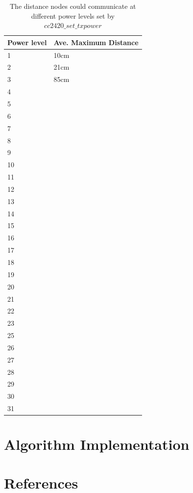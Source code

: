 \documentclass[a4paper,notitlepage]{article}
\begin{document}
\begin{table}[H]
	\centering
	\begin{tabular}{ | l | l | }
		\hline
		Power level & Ave. Maximum Distance \\
		\hline
		1 & 10cm \\
		2 & 21cm \\
		3 & 85cm \\
		4 & ~ \\
		5 & ~ \\
		6 & ~ \\
		7 & ~ \\
		8 & ~ \\
		9 & ~ \\
		10 & ~ \\
		11 & ~ \\
		12 & ~ \\
		13 & ~ \\
		14 & ~ \\
		15 & ~ \\
		16 & ~ \\
		17 & ~ \\
		18 & ~ \\
		19 & ~ \\
		20 & ~ \\
		21 & ~ \\
		22 & ~ \\
		23 & ~ \\
		25 & ~ \\
		26 & ~ \\
		27 & ~ \\
		28 & ~ \\
		29 & ~ \\
		30 & ~ \\
		31 & ~ \\
		\hline
	\end{tabular}
	\caption{The distance nodes could communicate at different power levels set by $cc2420\_set\_txpower$}
\end{table}

\newpage

\section{Algorithm Implementation}





\newpage


\section{References}
\renewcommand{\refname}{\vspace{-1cm}}


\end{document}
